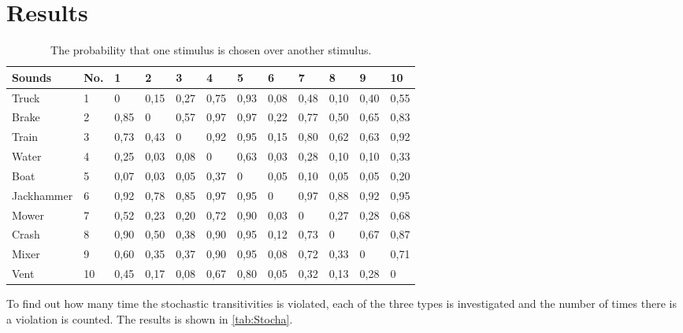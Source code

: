 \section*{Results}
\label{results}

\begin{table}[H]
\centering
\begin{tabular}{@{}llllllllllll@{}}
\toprule
Sounds     & No. & 1  & 2  & 3  & 4  & 5  & 6  & 7  & 8  & 9  & 10 \\ \midrule
Truck      & 1   & 0    & 0,15 & 0,27 & 0,75 & 0,93 & 0,08 & 0,48 & 0,10 & 0,40 & 0,55 \\
Brake      & 2   & 0,85 & 0    & 0,57 & 0,97 & 0,97 & 0,22 & 0,77 & 0,50 & 0,65 & 0,83 \\
Train      & 3   & 0,73 & 0,43 & 0    & 0,92 & 0,95 & 0,15 & 0,80 & 0,62 & 0,63 & 0,92 \\
Water      & 4   & 0,25 & 0,03 & 0,08 & 0    & 0,63 & 0,03 & 0,28 & 0,10 & 0,10 & 0,33 \\
Boat       & 5   & 0,07 & 0,03 & 0,05 & 0,37 & 0    & 0,05 & 0,10 & 0,05 & 0,05 & 0,20 \\
Jackhammer & 6   & 0,92 & 0,78 & 0,85 & 0,97 & 0,95 & 0    & 0,97 & 0,88 & 0,92 & 0,95 \\
Mower      & 7   & 0,52 & 0,23 & 0,20 & 0,72 & 0,90 & 0,03 & 0    & 0,27 & 0,28 & 0,68 \\
Crash      & 8   & 0,90 & 0,50 & 0,38 & 0,90 & 0,95 & 0,12 & 0,73 & 0    & 0,67 & 0,87 \\
Mixer      & 9   & 0,60 & 0,35 & 0,37 & 0,90 & 0,95 & 0,08 & 0,72 & 0,33 & 0    & 0,71 \\
Vent       & 10  & 0,45 & 0,17 & 0,08 & 0,67 & 0,80 & 0,05 & 0,32 & 0,13 & 0,28 & 0  \\ \bottomrule
\end{tabular}
\caption{The probability that one stimulus is chosen over another stimulus.}
\label{tab:data}
\end{table} 

To find out how many time the stochastic transitivities is violated, each of the three types is investigated and the number of times there is a violation is counted. The results is shown in \autoref{tab:Stocha}. 


 

